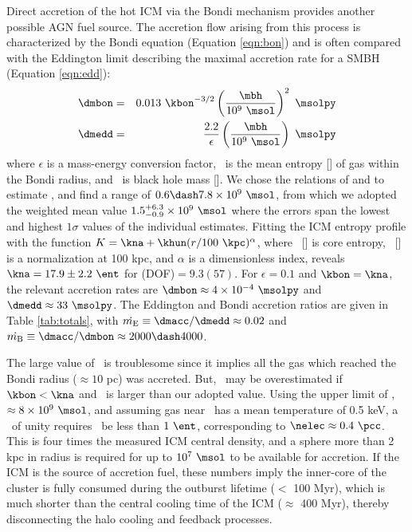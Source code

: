 \documentclass[11pt, preprint]{aastex}
\begin{document}
Direct accretion of the hot ICM via the Bondi mechanism provides
another possible AGN fuel source. The accretion flow arising from this
process is characterized by the Bondi equation (Equation
\ref{eqn:bon}) and is often compared with the Eddington limit
describing the maximal accretion rate for a SMBH (Equation
\ref{eqn:edd}):
\begin{eqnarray}
  \dmbon &=& 0.013 ~\kbon^{-3/2} \left(\frac{\mbh}{10^9
    ~\msol}\right)^{2} ~\msolpy \label{eqn:bon}\\
  \dmedd &=& \frac{2.2}{\epsilon} \left(\frac{\mbh}{10^9~\msol}\right)
  ~\msolpy  \label{eqn:edd}
\end{eqnarray}
where $\epsilon$ is a mass-energy conversion factor, \kbon\ is the
mean entropy [\ent] of gas within the Bondi radius, and \mbh\ is black
hole mass [\msol]. We chose the relations of
\citet{2002ApJ...574..740T} and \citet{2007MNRAS.379..711G} to
estimate \mbh, and find a range of $0.6 \dash 7.8 \times 10^9 ~\msol$,
from which we adopted the weighted mean value $1.5^{+6.3}_{-0.9}
\times 10^9 ~\msol$ where the errors span the lowest and highest
$1\sigma$ values of the individual estimates. Fitting the ICM entropy
profile with the function $K = \kna +\khun (r/100 ~\kpc)^{\alpha}$,
where \kna\ [\ent] is core entropy, \khun\ [\ent] is a normalization
at 100 kpc, and $\alpha$ is a dimensionless index, reveals $\kna =
17.9 \pm 2.2 ~\ent$ for \chisq(DOF)$ = 9.3(57)$. For $\epsilon = 0.1$
and $\kbon = \kna$, the relevant accretion rates are $\dmbon \approx 4
\times 10^{-4} ~\msolpy$ and $\dmedd \approx 33 ~\msolpy$. The
Eddington and Bondi accretion ratios are given in Table
\ref{tab:totals}, with $\dme \equiv \dmacc/\dmedd \approx 0.02$ and
$\dmb \equiv \dmacc/\dmbon \approx 2000 \dash 4000$.

The large value of \dmb\ is troublesome since it implies all the gas
which reached the Bondi radius ($\approx 10$ pc) was accreted. But,
\dmb\ may be overestimated if $\kbon < \kna$ and \mbh\ is larger than
our adopted value. Using the upper limit of \mbh, $\approx 8 \times
10^9 ~\msol$, and assuming gas near \rbon\ has a mean temperature of
0.5 keV, a \dmb\ of unity requires \kbon\ be less than $1 ~\ent$,
corresponding to $\nelec \approx 0.4 ~\pcc$. This is four times the
measured ICM central density, and a sphere more than 2 kpc in radius
is required for up to $10^7 ~\msol$ to be available for accretion. If
the ICM is the source of accretion fuel, these numbers imply the
inner-core of the cluster is fully consumed during the outburst
lifetime ($<$ 100 Myr), which is much shorter than the central cooling
time of the ICM ($\approx$ 400 Myr), thereby disconnecting the halo
cooling and feedback processes.
\end{document}
